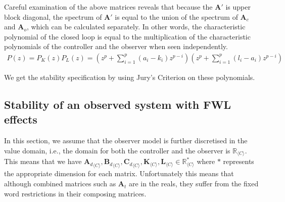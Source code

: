 \documentclass[sigconf]{llncs}
\newcommand{\mat}[1]{\boldsymbol{#1}}
\begin{document}
Careful examination of the above matrices reveals that because the $\mat{A}'$ is
upper block diagonal, the spectrum of $\mat{A}'$ is equal to the union of
the spectrum of $\mat{A}_{c}$ and $\mat{A}_{o}$, which can be calculated
separately.  In other words, the characteristic polynomial of the closed loop is
equal to the multiplication of the characteristic polynomials of the controller
and the observer when seen independently.
%
\begin{align*}
P(z)=P_K(z)P_L(z)=\left(z^p+\sum_{i=1}^p{(a_i-k_i)z^{p-i}}\right) \left(z^p+\sum_{i=1}^p{(l_i-a_i)z^{p-i}}\right)
\end{align*}

We get the stability specification by using Jury's Criterion on these polynomials.

\subsection{Stability of an observed system with FWL effects}\label{sec:cof_fwl_stability}

In this section, we assume that the observer model is further discretised in
the value domain, i.e., the domain for both
the controller and the observer is $\mathbb{R}_{\langle C \rangle}$.
%
This means that we have 
${\mat{A}_d}_{\langle C
\rangle},{\mat{B}_d}_{\langle C \rangle},{\mat{C}_d}_{\langle C \rangle},
\mat{K}_{\langle C \rangle}, \mat{L}_{\langle C \rangle} \in
\mathbb{R}_{\langle C \rangle}^*$ where $*$ represents the appropriate
dimension for each matrix.  Unfortunately this means that although combined
matrices such as $\mat{A}_t$ are in the reals, they suffer from the fixed
word restrictions in their composing matrices.
\end{document}
